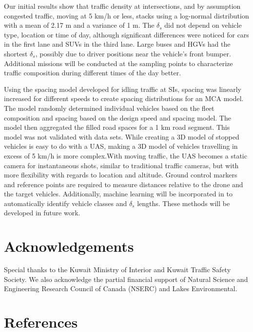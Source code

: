 \documentclass[preprint,12pt,a4paper]{elsarticle}
\begin{document}
\begin{linenumbers}
Our initial results show that traffic density at intersections, and by assumption congested traffic, moving at 5 km/h or less, stacks using a log-normal distribution with a mean of 2.17 m and a variance of 1 m. The $\delta_{s}$ did not depend on vehicle type, location or time of day, although significant differences were noticed for cars in the first lane and SUVs in the third lane. Large buses and HGVs had the shortest $\delta_{s}$, possibly due to driver positions near the vehicle's front bumper. Additional missions will be conducted at the sampling points to characterize traffic composition during different times of the day better.

Using the spacing model developed for idling traffic at SIs, spacing was linearly increased for different speeds to create spacing distributions for an MCA model. The model randomly determined individual vehicles based on the fleet composition and spacing based on the design speed and spacing model. The model then aggregated the filled road spaces for a 1 km road segment. This model was not validated with data sets. While creating a 3D model of stopped vehicles is easy to do with a UAS, making a 3D model of vehicles travelling in excess of 5 km/h is more complex.With moving traffic, the UAS becomes a static camera for instantaneous shots, similar to traditional traffic cameras, but with more flexibility with regards to location and altitude. Ground control markers and reference points are required to measure distances relative to the drone and the target vehicles. Additionally, machine learning will be incorporated in to automatically identify vehicle classes and $\delta_{s}$ lengths. These methods will be developed in future work.

\section{Acknowledgements}
Special thanks to the Kuwait Ministry of Interior and Kuwait Traffic Safety Society.  We also acknowledge the partial financial support of Natural Science and Engineering Research Council of Canada (NSERC) and Lakes Environmental.
 
\section{References}

\end{linenumbers}
{}

\end{document}
